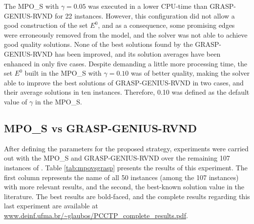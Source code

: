 \documentclass{singlecol-new}
\theoremstyle{TH}{
\newtheorem{lemma}{Lemma}
\newtheorem{theorem}[lemma]{Theorem}
\newtheorem{corrolary}[lemma]{Corrolary}
\newtheorem{conjecture}[lemma]{Conjecture}
\newtheorem{proposition}[lemma]{Proposition}
\newtheorem{claim}[lemma]{Claim}
\newtheorem{stheorem}[lemma]{Wrong Theorem}
}
\theoremstyle{THrm}{
\newtheorem{definition}{Definition}[section]
\newtheorem{question}{Question}[section]
\newtheorem{remark}{Remark}
\newtheorem{scheme}{Scheme}
}
\theoremstyle{THhit}{
\newtheorem{case}{Case}[section]
}
\begin{document}
The MPO\_S with $ \gamma = 0.05 $ was executed in a lower CPU-time than GRASP-GENIUS-RVND for 22 instances. However, this configuration did not allow a good construction of the set $E^0$, and as a consequence, some promising edges were erroneously removed from the model, and the solver was not able to achieve good quality solutions. None of the best solutions found by the GRASP-GENIUS-RVND has been improved, and its solution averages have been enhanced in only five cases. Despite demanding a little more processing time, the set $E^0 $ built in the MPO\_S with $\gamma = 0.10$ was of better quality, making the solver able to improve the best solutions of GRASP-GENIUS-RVND  in two cases, and their average solutions in ten instances. Therefore, 0.10 was defined as the default value of $ \gamma $ in the MPO\_S.



\subsection{MPO\_S vs GRASP-GENIUS-RVND}

After defining the parameters for the proposed strategy, experiments were carried out with the MPO\_S and GRASP-GENIUS-RVND over the remaining 107 instances of \citet{silva2009problema}. Table \ref{tab:mpovsgrasp} presents the results of this experiment. The first column represents  the name of all 50 instances (among the 107 instances) with more relevant results, and the second, the best-known solution value in the literature. The best results are bold-faced, and the complete results regarding this last experiment are available at \url{www.deinf.ufma.br/~glaubos/PCCTP_complete_results.pdf}.
\end{document}
